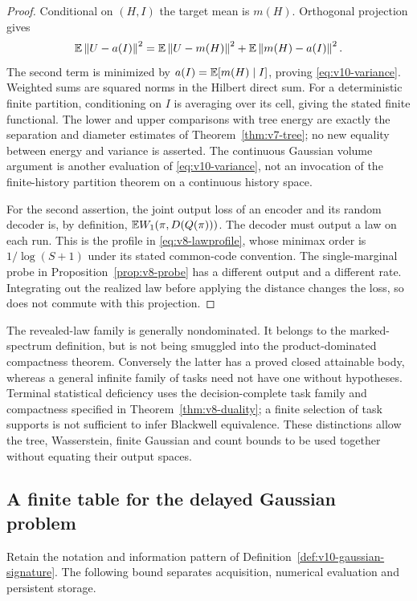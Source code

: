 \begin{proof}
Conditional on $(H,I)$ the target mean is $m(H)$. Orthogonal
projection gives
\[
 \mathbb E\left\lVert U-a(I)\right\rVert^2=
 \mathbb E\left\lVert U-m(H)\right\rVert^2+\mathbb E\left\lVert m(H)-a(I)\right\rVert^2.
\]
The second term is minimized by $a(I)=\mathbb E[m(H)\mid I]$, proving
\eqref{eq:v10-variance}. Weighted sums are squared norms in the
Hilbert direct sum. For a deterministic finite partition, conditioning
on $I$ is averaging over its cell, giving the stated finite functional.
The lower and upper comparisons with tree energy are exactly the
separation and diameter estimates of Theorem~\ref{thm:v7-tree}; no
new equality between energy and variance is asserted. The continuous
Gaussian volume argument is another evaluation of
\eqref{eq:v10-variance}, not an invocation of the finite-history
partition theorem on a continuous history space.

For the second assertion, the joint output loss of an encoder and
its random decoder is, by definition,
$\mathbb E W_1(\pi,D(Q(\pi)))$. The decoder must output a law on each run.
This is the profile in \eqref{eq:v8-lawprofile}, whose minimax order
is $1/\log(S+1)$ under its stated common-code convention. The
single-marginal probe in Proposition~\ref{prop:v8-probe} has a
different output and a different rate. Integrating out the realized
law before applying the distance changes the loss, so does not
commute with this projection.
\end{proof}

The revealed-law family is generally nondominated. It belongs to the
marked-spectrum definition, but is not being smuggled into the
product-dominated compactness theorem. Conversely the latter has a
proved closed attainable body, whereas a general infinite family of
tasks need not have one without hypotheses. Terminal statistical
deficiency uses the decision-complete task family and compactness
specified in Theorem~\ref{thm:v8-duality}; a finite selection of task
supports is not sufficient to infer Blackwell equivalence. These
distinctions allow the tree, Wasserstein, finite Gaussian and count
bounds to be used together without equating their output spaces.

\subsection{A finite table for the delayed Gaussian problem}
Retain the notation and information pattern of
Definition~\ref{def:v10-gaussian-signature}. The following bound
separates acquisition, numerical evaluation and persistent storage.

